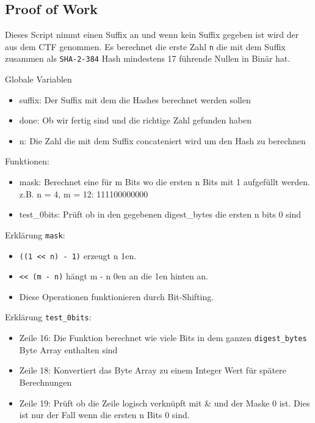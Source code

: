 \documentclass[12pt,a4paper,titlepage,oneside]{scrartcl}
\begin{document}
\pagebreak
\subsection{Proof of Work}


Dieses Script nimmt einen Suffix an und wenn kein Suffix gegeben ist wird der aus dem CTF genommen. Es berechnet die erste Zahl \lstinline{n} die mit dem Suffix zusammen als \lstinline{SHA-2-384} Hash mindestens 17 führende Nullen in Binär hat.

Globale Variablen
\begin{itemize}
    \item suffix: Der Suffix mit dem die Hashes berechnet werden sollen
    \item done: Ob wir fertig sind und die richtige Zahl gefunden haben
    \item n: Die Zahl die mit dem Suffix concateniert wird um den Hash zu berechnen
\end{itemize}

Funktionen:
\begin{itemize}
    \item mask: Berechnet eine für m Bits wo die ersten n Bits mit 1 aufgefüllt werden. z.B. n = 4, m = 12: 111100000000
    \item test\_0bits: Prüft ob in den gegebenen digest\_bytes die ersten n bits 0 sind
\end{itemize}

Erklärung \lstinline{mask}:
\begin{itemize}
    \item \lstinline{((1 << n) - 1)} erzeugt n 1en.
    \item \lstinline{<< (m - n)} hängt m - n 0en an die 1en hinten an.
    \item Diese Operationen funktionieren durch Bit-Shifting.
\end{itemize}

Erklärung \lstinline{test_0bits}:
\begin{itemize}
    \item Zeile 16: Die Funktion berechnet wie viele Bits in dem ganzen \lstinline{digest_bytes} Byte Array enthalten sind
    \item Zeile 18: Konvertiert das Byte Array zu einem Integer Wert für spätere Berechnungen
    \item Zeile 19: Prüft ob die Zeile logisch verknüpft mit \& und der Maske 0 ist. Dies ist nur der Fall wenn die ersten n Bits 0 sind.
\end{itemize}
\end{document}
